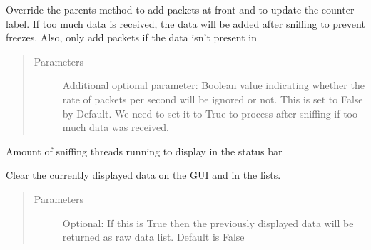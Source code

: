 \documentclass[letterpaper,10pt,english]{sphinxmanual}
\begin{document}
\begin{fulllineitems}
\begin{fulllineitems}
\label{\detokenize{src:src.SnifferTabElement.SnifferTabElement.addPacket}}
Override the parents method to add packets at front and to update the counter label.
If too much data is received, the data will be added after sniffing to prevent freezes.
Also, only add packets if the data isn’t present in 
\begin{quote}\begin{description}
\item[{Parameters}] \leavevmode
{} \textendash{} Additional optional parameter: Boolean value indicating whether the rate of
packets per second will be ignored or not. This is set to False by Default.
We need to set it to True to process  after sniffing if too much
data was received.

\end{description}\end{quote}

\end{fulllineitems}


\begin{fulllineitems}
\label{\detokenize{src:src.SnifferTabElement.SnifferTabElement.amountThreadsRunning}}
Amount of sniffing threads running to display in the status bar

\end{fulllineitems}


\begin{fulllineitems}
\label{\detokenize{src:src.SnifferTabElement.SnifferTabElement.clear}}
Clear the currently displayed data on the GUI and in the lists.
\begin{quote}\begin{description}
\item[{Parameters}] \leavevmode
{} \textendash{} Optional: If this is True then the previously displayed data will be returned as
raw data list. Default is False


\end{description}
\end{quote}
\end{fulllineitems}
\end{fulllineitems}
\end{document}
